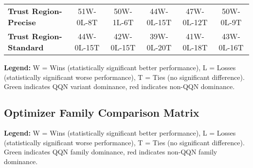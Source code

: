 \documentclass[10pt]{article}
\begin{document}
\begin{table}[H]
{\begin{tabular}{lccccc}
\textbf{Trust Region-Precise} & \textcolor{green!70!black}{51W-0L-8T} & \textcolor{green!70!black}{50W-1L-6T} & \textcolor{green!70!black}{44W-0L-15T} & \textcolor{green!70!black}{47W-0L-12T} & \textcolor{green!70!black}{50W-0L-9T} \\
\textbf{Trust Region-Standard} & \textcolor{green!70!black}{44W-0L-15T} & \textcolor{green!70!black}{42W-0L-15T} & \textcolor{green!70!black}{39W-0L-20T} & \textcolor{green!70!black}{41W-0L-18T} & \textcolor{green!70!black}{43W-0L-16T} \\
\bottomrule
\end{tabular}
}
\end{table}
\textbf{Legend:} W = Wins (statistically significant better performance), L = Losses (statistically significant worse performance), T = Ties (no significant difference). Green indicates QQN variant dominance, red indicates non-QQN dominance.

\subsection{Optimizer Family Comparison Matrix}
\begin{table}[H]
\centering
\caption{Optimizer Family Comparison Matrix}
\label{tab:family_comparison_matrix}
\end{table}
\textbf{Legend:} W = Wins (statistically significant better performance), L = Losses (statistically significant worse performance), T = Ties (no significant difference). Green indicates QQN family dominance, red indicates non-QQN family dominance.
\end{document}
